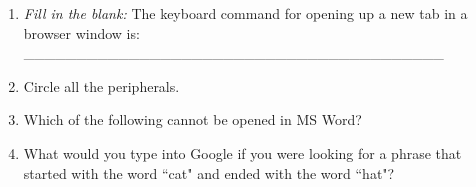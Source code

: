 \documentclass[11pt]{article}
\begin{document}
\begin{enumerate}
\item \emph{Fill in the blank:} The keyboard command for opening up a new tab in a browser window is:\n
\vspace{1.5mm} 
\_\_\_\_\_\_\_\_\_\_\_\_\_\_\_\_\_\_\_\_\_\_\_\_\_\_\_\_\_\_\_\_\_\_\_\_\_\_\_\_
\vspace{1.5mm}

\item Circle all the peripherals.

\vspace{1.5mm}
\newpage

\item Which of the following cannot be opened in MS Word?

\vspace{1.5mm}

\item What would you type into Google if you were looking for a phrase that started with the word ``cat" and ended with the word ``hat"?
\vspace{15}

\end{enumerate}
\end{document}
